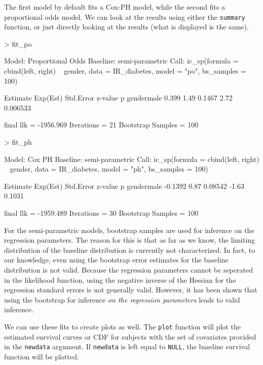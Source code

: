 \documentclass[a4paper]{article}
\begin{document}
The first model by default fits a Cox-PH model, while the second fits a proportional odds model. We can look at the results using either the \texttt{summary} function, or just directly looking at the results (what is displayed is the same). 
  
\begin{Schunk}
\begin{Sinput}
>   fit_po
\end{Sinput}
\begin{Soutput}
Model:  Proportional Odds
Baseline:  semi-parametric 
Call: ic_sp(formula = cbind(left, right) ~ gender, data = IR_diabetes, 
    model = "po", bs_samples = 100)

           Estimate Exp(Est) Std.Error z-value        p
gendermale    0.399     1.49    0.1467    2.72 0.006533

final llk =  -1956.969 
Iterations =  21 
Bootstrap Samples =  100 
\end{Soutput}
\begin{Sinput}
>   fit_ph
\end{Sinput}
\begin{Soutput}
Model:  Cox PH
Baseline:  semi-parametric 
Call: ic_sp(formula = cbind(left, right) ~ gender, data = IR_diabetes, 
    model = "ph", bs_samples = 100)

           Estimate Exp(Est) Std.Error z-value      p
gendermale  -0.1392     0.87   0.08542   -1.63 0.1031

final llk =  -1959.489 
Iterations =  30 
Bootstrap Samples =  100 
\end{Soutput}
\end{Schunk}

For the semi-parametric models, bootstrap samples are used for inference on the regression parameters. The reason for this is that as far as we know, the limiting distribution of the baseline distribution is currently not characterized. In fact, to our knowledge, even using the bootstrap error estimates for the baseline distribution is not valid. Because the regression parameters cannot be seperated in the likelihood function, using the negative inverse of the Hessian for the regression standard errors is not generally valid. However, it has been shown that using the bootstrap for inference \emph{on the regression parameters} leads to valid inference. 

We can use these fits to create plots as well. The \texttt{plot} function will plot the estimated survival curves or CDF for subjects with the set of covariates provided in the \texttt{newdata} argument. If \texttt{newdata} is left equal to \texttt{NULL}, the baseline survival function will be plotted. 
  
\end{document}
